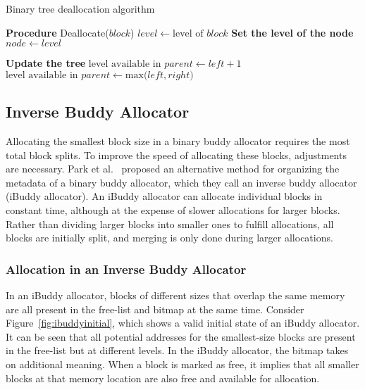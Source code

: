 \begin{algorithm}
  \caption{Binary tree deallocation algorithm}
  \label{alg:btbuddy_dealloc}
  \begin{algorithmic}[1]
    \Statex \textbf{Procedure} Deallocate($block$)
    \State $level \gets \text{level of } block$
    \Statex \textbf{Set the level of the node}
    \State $node \gets level$

    \Statex \textbf{Update the tree}
    \State $\text{level available in } parent \gets left + 1$
    \Else
    \State $\text{level available in } parent \gets \text{max(}left,right\text{)}$
    \EndIf
    \EndFor
  \end{algorithmic}
\end{algorithm}

\subsection{Inverse Buddy Allocator}
Allocating the smallest block size in a binary buddy allocator requires the most total block splits. To improve the speed of allocating these blocks, adjustments are necessary. Park et al.~\cite{park2014ibuddy} proposed an alternative method for organizing the metadata of a binary buddy allocator, which they call an inverse buddy allocator (iBuddy allocator). An iBuddy allocator can allocate individual blocks in constant time, although at the expense of slower allocations for larger blocks. Rather than dividing larger blocks into smaller ones to fulfill allocations, all blocks are initially split, and merging is only done during larger allocations.

\subsubsection{Allocation in an Inverse Buddy Allocator}
In an iBuddy allocator, blocks of different sizes that overlap the same memory are all present in the free-list and bitmap at the same time. Consider Figure~\ref{fig:ibuddyinitial}, which shows a valid initial state of an iBuddy allocator. It can be seen that all potential addresses for the smallest-size blocks are present in the free-list but at different levels. In the iBuddy allocator, the bitmap takes on additional meaning. When a block is marked as free, it implies that all smaller blocks at that memory location are also free and available for allocation.

